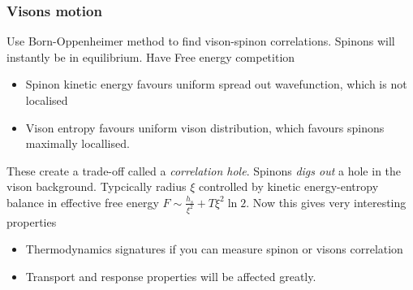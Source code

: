 \documentclass[a4paper]{article}
\begin{document}
\subsubsection{Visons motion}
Use Born-Oppenheimer method to find vison-spinon correlations. Spinons will
instantly be in equilibrium.
Have Free energy competition
\begin{itemize}
    \item Spinon kinetic energy favours uniform spread out wavefunction, which
        is not localised
    \item Vison entropy favours uniform vison distribution, which favours
        spinons maximally locallised.
\end{itemize}
These create a trade-off called a \emph{correlation hole}. Spinons \emph{digs
out} a hole  in the vison background. Typcically radius $\xi$ controlled by kinetic
energy-entropy balance in effective free energy $F\sim
\frac{h_s}{\xi^2}+T\xi^2\ln 2$.
Now this gives very interesting properties 
\begin{itemize}
    \item Thermodynamics signatures if you can measure spinon or visons
        correlation
    \item Transport and response properties will be affected greatly.
\end{itemize}
\end{document}
